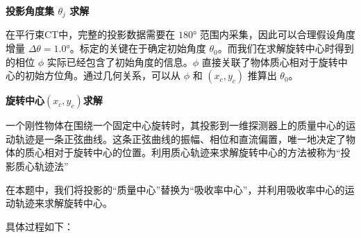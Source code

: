\textbf{投影角度集 $\theta_j$ 求解}
\par
在平行束CT中，完整的投影数据需要在 $180°$ 范围内采集，因此可以合理假设角度增量 $\Delta\theta=1.0°$。标定的关键在于确定初始角度 $\theta_0$。而我们在求解旋转中心时得到的相位 $\phi$ 实际已经包含了初始角度的信息。$\phi$ 直接关联了物体质心相对于旋转中心的初始方位角。通过几何关系，可以从 $\phi$ 和 $(x_c,y_c)$ 推算出 $\theta_0$。  



\textbf{旋转中心$(x_c,y_c)$求解}
\par
一个刚性物体在围绕一个固定中心旋转时，其投影到一维探测器上的质量中心的运动轨迹是一条正弦曲线。这条正弦曲线的振幅、相位和直流偏置，唯一地决定了物体的质心相对于旋转中心的位置。利用质心轨迹来求解旋转中心的方法被称为“投影质心轨迹法”\par
在本题中，我们将投影的“质量中心”替换为“吸收率中心”，并利用吸收率中心的运动轨迹来求解旋转中心。\par
具体过程如下：
